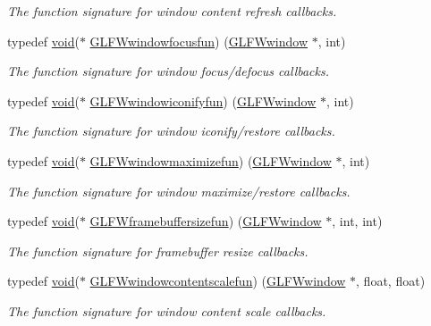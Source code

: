 \begin{DoxyCompactItemize}
\begin{DoxyCompactList}\small\item\em The function signature for window content refresh callbacks. \end{DoxyCompactList}\item 
typedef \mbox{\hyperlink{glad_8h_a950fc91edb4504f62f1c577bf4727c29}{void}}($\ast$ \mbox{\hyperlink{group__window_ga58be2061828dd35080bb438405d3a7e2}{G\+L\+F\+Wwindowfocusfun}}) (\mbox{\hyperlink{group__window_ga3c96d80d363e67d13a41b5d1821f3242}{G\+L\+F\+Wwindow}} $\ast$, int)
\begin{DoxyCompactList}\small\item\em The function signature for window focus/defocus callbacks. \end{DoxyCompactList}\item 
typedef \mbox{\hyperlink{glad_8h_a950fc91edb4504f62f1c577bf4727c29}{void}}($\ast$ \mbox{\hyperlink{group__window_gad2d4e4c3d28b1242e742e8268b9528af}{G\+L\+F\+Wwindowiconifyfun}}) (\mbox{\hyperlink{group__window_ga3c96d80d363e67d13a41b5d1821f3242}{G\+L\+F\+Wwindow}} $\ast$, int)
\begin{DoxyCompactList}\small\item\em The function signature for window iconify/restore callbacks. \end{DoxyCompactList}\item 
typedef \mbox{\hyperlink{glad_8h_a950fc91edb4504f62f1c577bf4727c29}{void}}($\ast$ \mbox{\hyperlink{group__window_ga7269a3d1cb100c0081f95fc09afa4949}{G\+L\+F\+Wwindowmaximizefun}}) (\mbox{\hyperlink{group__window_ga3c96d80d363e67d13a41b5d1821f3242}{G\+L\+F\+Wwindow}} $\ast$, int)
\begin{DoxyCompactList}\small\item\em The function signature for window maximize/restore callbacks. \end{DoxyCompactList}\item 
typedef \mbox{\hyperlink{glad_8h_a950fc91edb4504f62f1c577bf4727c29}{void}}($\ast$ \mbox{\hyperlink{group__window_ga3e218ef9ff826129c55a7d5f6971a285}{G\+L\+F\+Wframebuffersizefun}}) (\mbox{\hyperlink{group__window_ga3c96d80d363e67d13a41b5d1821f3242}{G\+L\+F\+Wwindow}} $\ast$, int, int)
\begin{DoxyCompactList}\small\item\em The function signature for framebuffer resize callbacks. \end{DoxyCompactList}\item 
typedef \mbox{\hyperlink{glad_8h_a950fc91edb4504f62f1c577bf4727c29}{void}}($\ast$ \mbox{\hyperlink{group__window_ga1da46b65eafcc1a7ff0adb8f4a7b72fd}{G\+L\+F\+Wwindowcontentscalefun}}) (\mbox{\hyperlink{group__window_ga3c96d80d363e67d13a41b5d1821f3242}{G\+L\+F\+Wwindow}} $\ast$, float, float)
\begin{DoxyCompactList}\small\item\em The function signature for window content scale callbacks. \end{DoxyCompactList}\end{DoxyCompactItemize}
